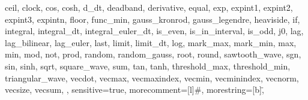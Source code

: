 {{      ceil,
      clock,
      cos,
      cosh,
      d_dt,
      deadband,
      derivative,
      equal,
      exp,
      expint1,
      expint2,
      expint3,
      expintn,
      floor,
      func_min,
      gauss_kronrod,
      gauss_legendre,
      heaviside,
      if,
      integral,
      integral_dt,
      integral_euler_dt,
      is_even,
      is_in_interval,
      is_odd,
      j0,
      lag,
      lag_bilinear,
      lag_euler,
      last,
      limit,
      limit_dt,
      log,
      mark_max,
      mark_min,
      max,
      min,
      mod,
      not,
      prod,
      random,
      random_gauss,
      root,
      round,
      sawtooth_wave,
      sgn,
      sin,
      sinh,
      sqrt,
      square_wave,
      sum,
      tan,
      tanh,
      threshold_max,
      threshold_min,
      triangular_wave,
      vecdot,
      vecmax,
      vecmaxindex,
      vecmin,
      vecminindex,
      vecnorm,
      vecsize,
      vecsum,
},
sensitive=true,
morecomment=[l]{\#},
morestring=[b]\",
}
